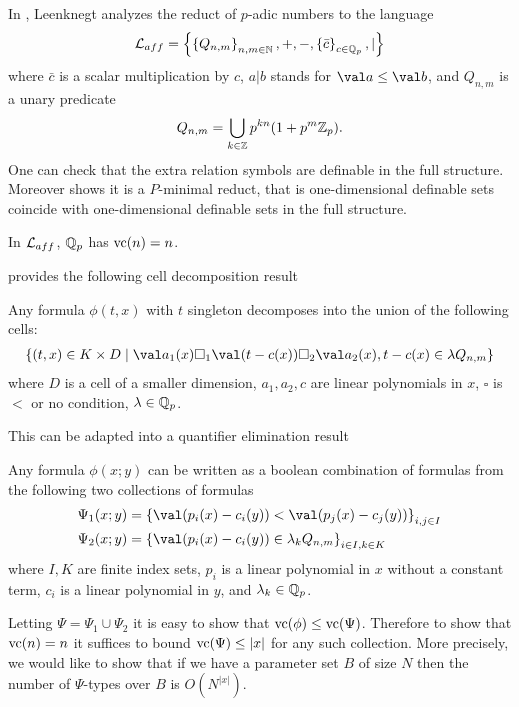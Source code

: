 \documentclass[final]{beamer}
\newcommand{\curly}[1]{\left\{ #1 \right\}}
\newlength{\twocolwid}
\begin{document}
\begin{frame}[t]
\begin{columns}[t]
\begin{column}{\twocolwid}
In \cite{reduct}, Leenknegt analyzes the reduct of $p$-adic numbers to the language
\begin{align*}
    \LL_{aff}  = \curly{\curly{Q_{n,m}}_{n,m\in \N}, +, -, \curly{\bar c}_{c \in \Q_p}, | }
\end{align*}
where $\bar c$ is a scalar multiplication by $c$,
$a | b$ stands for $\val a \leq \val b$,
and $Q_{n,m}$ is a unary predicate
\begin{align*}
    Q_{n,m} = \bigcup_{k \in \mathbb{Z}} p^{kn} (1 + p^m\mathbb{Z}_p).
\end{align*}
One can check that the extra relation symbols are definable in the full structure.
Moreover \cite{reduct} shows it is a $P$-minimal reduct,
that is one-dimensional definable sets coincide with one-dimensional definable sets in the full structure.
\begin{Theorem} [B.]
    In $\mathcal L_{aff}$, $\mathbb{Q}_p$ has $\operatorname{vc}(n) = n$.
\end{Theorem}


\cite{reduct} provides the following cell decomposition result
\begin{Theorem}
    Any formula $\phi(t, x)$  with $t$  singleton decomposes into the union of the following cells:
    \begin{align*}
            \curly{(t, x) \in K \times D \mid \val a_1(x) \square_1 \val (t - c(x)) \square_2 \val a_2(x), t - c(x) \in \lambda Q_{n,m} }
    \end{align*}
    where $D$ is a cell of a smaller dimension, $a_1, a_2, c$ are linear polynomials in  $x$, $\square$ is $<$ or no condition, $\lambda  \in\mathbb{Q}_p$.    
\end{Theorem}

This can be adapted into a quantifier elimination result
\begin{Corollary}
    Any formula $\phi(x; y)$ can be written as a boolean combination of formulas from the following two collections of formulas
    \begin{align*}
            &\Psi_1(x; y) = \curly{\val (p_i(x) - c_i(y)) < \val (p_j(x) - c_j(y))}_{i, j \in I} \\
            &\Psi_2(x; y) = \curly{\val (p_i(x) - c_i(y)) \in \lambda_k Q_{n,m}}_{i \in I , k \in K}
    \end{align*}
    where $I, K$ are finite index sets,
    $p_i$ is a linear polynomial in $x$ without a constant term,
    $c_i$ is a linear polynomial in $y$, and
    $\lambda_k \in \mathbb{Q}_p$.
\end{Corollary}
Letting $\Psi = \Psi_1 \cup \Psi_2$ it is easy to show that $\operatorname{vc}(\phi) \leq \operatorname{vc}(\Psi)$.
Therefore to show that $\operatorname{vc}(n) = n$ it suffices to bound $\operatorname{vc}(\Psi) \leq |x|$ for any such collection.
More precisely, we would like to show that if we have a parameter set $B$ of size $N$ then the number of $\Psi$-types over $B$ is $O(N^{|x|})$.


\end{column}
\end{columns}
\end{frame}
\end{document}
